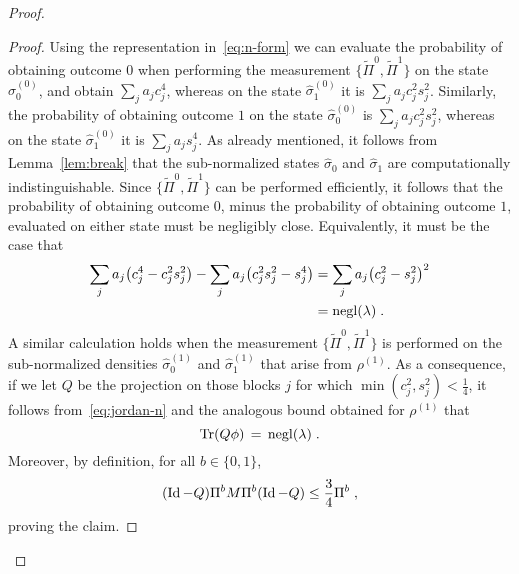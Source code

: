 \documentclass[11pt]{article}
\theoremstyle{remark}
\theoremstyle{definition}
\newcommand{\Tr}{\mbox{\rm Tr}}
\newcommand{\Id}{\ensuremath{\mathop{\rm Id}\nolimits}}
\DeclareMathOperator{\negl}{negl}
\begin{document}
\begin{proof}
\begin{proof}
Using the representation in~\eqref{eq:n-form} we can evaluate the probability of obtaining outcome $0$ when performing the measurement $\{\tilde{\Pi}^0,\tilde{\Pi}^1\}$ on the state $\hat{\sigma}_{0}^{(0)}$, and obtain $ \sum_j a_j c_j^4$, whereas on the state $\hat{\sigma}_1^{(0)}$ it is $ \sum_j a_j c_j^2s_j^2$. Similarly, the probability of obtaining outcome $1$ on the state $\hat{\sigma}_0^{(0)}$ is $ \sum_j a_j c_j^2 s_j^2$, whereas on the state $\hat{\sigma}_1^{(0)}$ it is $ \sum_j a_j s_j^4$. As already mentioned, it follows from Lemma~\ref{lem:break} that the sub-normalized states $\hat{\sigma}_{0}$ and $\hat{\sigma}_{1}$ are computationally indistinguishable. Since $\{\tilde{\Pi}^0,\tilde{\Pi}^1\}$ can be performed efficiently, it follows that the probability of obtaining outcome $0$, minus the probability of obtaining outcome $1$, evaluated on either state must be negligibly close. Equivalently, it must be the case that
\begin{align}
 \sum_j a_j\big(c_j^4 - c_j^2 s_j^2 \big) - \sum_j a_j\big( c_j^2 s_j^2 - s_j^4 \big)
&= \sum_j a_j\big(c_j^2 - s_j^2 \big)^2\notag\\
&= \negl(\lambda)\;.\label{eq:jordan-n}
\end{align}
A similar calculation holds when the measurement $\{\tilde{\Pi}^0,\tilde{\Pi}^1\}$ is performed on the sub-normalized densities $\hat{\sigma}_{0}^{(1)}$ and $\hat{\sigma}_{1}^{(1)}$ that arise from $\rho^{(1)}$. As a consequence, if we let $Q$ be the projection on those blocks $j$ for which $\min(c_j^2,s_j^2) < \frac{1}{4}$, it follows from~\eqref{eq:jordan-n} and the analogous bound obtained for $\rho^{(1)}$ that 
\begin{equation}\label{eq:q-negl}
 \Tr(Q \phi) \,=\, \negl(\lambda)\;.
\end{equation}
Moreover, by definition, for all $b\in\{0,1\}$, 
\begin{equation}\label{eq:q-norm}
(\Id-Q)\Pi^b M \Pi^b (\Id-Q) \leq \frac{3}{4} \Pi^b\;,
\end{equation}
proving the claim. 

\end{proof}
\end{proof}
\end{document}
